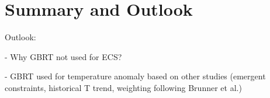 


\chapter{Summary and Outlook}
\label{ch:07:summary_outlook}

Outlook:

- Why GBRT not used for ECS?

- GBRT used for temperature anomaly based on other studies (emergent
constraints, historical T trend, weighting following Brunner et al.)
